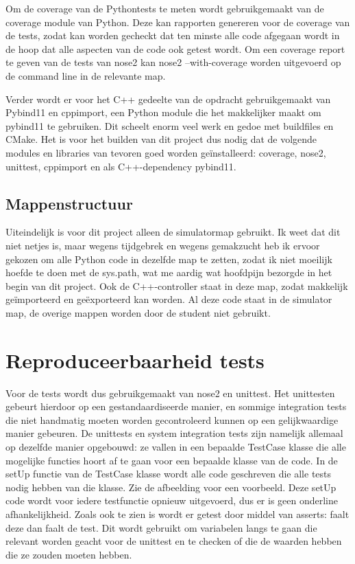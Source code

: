 \documentclass{article}
\begin{document}
    Om de coverage van de Pythontests te meten wordt gebruikgemaakt van de coverage module van Python. Deze kan rapporten genereren voor de coverage van de tests, zodat kan worden gecheckt dat ten minste alle code afgegaan wordt in de hoop dat alle aspecten van de code ook getest wordt. Om een coverage report te geven van de tests van nose2 kan nose2 --with-coverage worden uitgevoerd op de command line in de relevante map.
    
    Verder wordt er voor het C++ gedeelte van de opdracht gebruikgemaakt van Pybind11 en cppimport, een Python module die het makkelijker maakt om pybind11 te gebruiken. Dit scheelt enorm veel werk en gedoe met buildfiles en CMake. Het is voor het builden van dit project dus nodig dat de volgende modules en libraries van tevoren goed worden ge\"installeerd: coverage, nose2, unittest, cppimport en als C++-dependency pybind11.
    
    \subsection{Mappenstructuur}
    Uiteindelijk is voor dit project alleen de simulatormap gebruikt. Ik weet dat dit niet netjes is, maar wegens tijdgebrek en wegens gemakzucht heb ik ervoor gekozen om alle Python code in dezelfde map te zetten, zodat ik niet moeilijk hoefde te doen met de sys.path, wat me aardig wat hoofdpijn bezorgde in het begin van dit project. Ook de C++-controller staat in deze map, zodat makkelijk ge\"importeerd en ge\"exporteerd kan worden. Al deze code staat in de simulator map, de overige mappen worden door de student niet gebruikt.
    
    \section{Reproduceerbaarheid tests}
    Voor de tests wordt dus gebruikgemaakt van nose2 en unittest. Het unittesten gebeurt hierdoor op een gestandaardiseerde manier, en sommige integration tests die niet handmatig moeten worden gecontroleerd kunnen op een gelijkwaardige manier gebeuren. De unittests en system integration tests zijn namelijk allemaal op dezelfde manier opgebouwd: ze vallen in een bepaalde TestCase klasse die alle mogelijke functies hoort af te gaan voor een bepaalde klasse van de code. In de setUp functie van de TestCase klasse wordt alle code geschreven die alle tests nodig hebben van die klasse. Zie de afbeelding voor een voorbeeld. Deze setUp code wordt voor iedere testfunctie opnieuw uitgevoerd, dus er is geen onderline afhankelijkheid. Zoals ook te zien is wordt er getest door middel van asserts: faalt deze dan faalt de test. Dit wordt gebruikt om variabelen langs te gaan die relevant worden geacht voor de unittest en te checken of die de waarden hebben die ze zouden moeten hebben.
    
\end{document}
